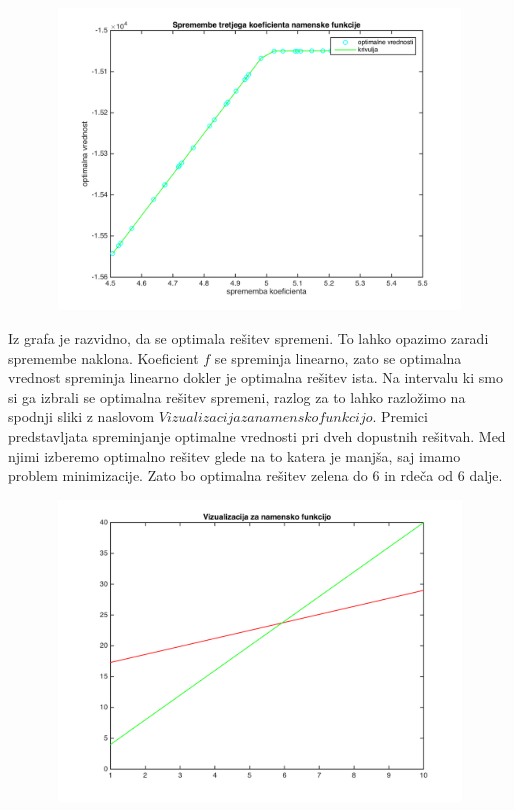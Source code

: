 \documentclass[a4paper,12pt]{article}
\begin{document}
\clearpage

\begin{figure}[h!]
\includegraphics[width=11.2cm,height=8cm]{spremembe_f3.png}
\centering
\end{figure}

Iz grafa je razvidno, da se optimala rešitev spremeni. To lahko opazimo zaradi spremembe naklona. Koeficient $f$ se spreminja linearno, zato se optimalna vrednost spreminja linearno dokler je optimalna rešitev ista. 
Na intervalu ki smo si ga izbrali se optimalna rešitev spremeni, razlog za to lahko razložimo na spodnji sliki z naslovom $Vizualizacija za namensko funkcijo$. Premici predstavljata spreminjanje optimalne vrednosti pri dveh dopustnih rešitvah. Med njimi izberemo optimalno rešitev glede na to katera je manjša, saj imamo problem minimizacije. Zato bo optimalna rešitev zelena do $6$ in rdeča od $6$ dalje.

\begin{figure}[h!]
\includegraphics[width=12cm,height=8cm]{razlaga1.png}
\centering
\end{figure}
\end{document}
